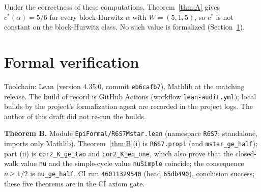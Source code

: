 \documentclass[11pt]{amsart}
\theoremstyle{definition}
\theoremstyle{remark}
\begin{document}
Under the correctness of these computations, Theorem~\ref{thm:A} gives $c^*(\alpha)=5/6$ for every block-Hurwitz
$\alpha$ with $W=(5,1,5)$, so $c^*$ is not constant on the block-Hurwitz class. No such value is formalized
(Section~\ref{sec:lean}).

\section{Formal verification}\label{sec:lean}

Toolchain: Lean (version 4.35.0, commit \texttt{eb6cafb7}), Mathlib at the matching release. The build of record
is GitHub Actions (workflow \texttt{lean-audit.yml}); local builds by the project's formalization agent are recorded
in the project logs. The author of this draft did not re-run the builds.

\medskip\noindent\textbf{Theorem B.} Module \texttt{EpiFormal/R6S7Mstar.lean} (namespace \texttt{R6S7}; standalone,
imports only Mathlib). Theorem~\ref{thm:B}(i) is \texttt{R6S7.prop1} (and \texttt{mstar\_ge\_half}); part (ii) is
\texttt{cor2\_K\_ge\_two} and \texttt{cor2\_K\_eq\_one}, which also prove that the closed-walk value \texttt{nu} and the
simple-cycle value \texttt{nuSimple} coincide; the consequence $\nu\ge1/2$ is \texttt{nu\_ge\_half}. CI run
\texttt{46011329540} (head \texttt{65db490}), conclusion success; these five theorems are in the CI axiom gate.
\end{document}
